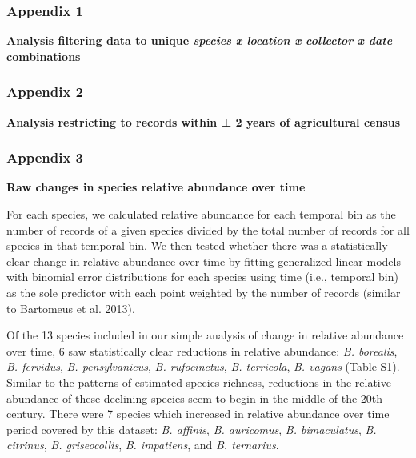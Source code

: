 \documentclass[11pt,]{article}
\begin{document}
\hypertarget{appendix-1}{%
\subsubsection{Appendix 1}\label{appendix-1}}

\textbf{Analysis filtering data to unique \emph{species x location x
collector x date} combinations}

\clearpage

\newpage

\hypertarget{appendix-2}{%
\subsubsection{Appendix 2}\label{appendix-2}}

\textbf{Analysis restricting to records within ± 2 years of agricultural
census}

\newpage

\hypertarget{appendix-3}{%
\subsubsection{Appendix 3}\label{appendix-3}}

\textbf{Raw changes in species relative abundance over time}

For each species, we calculated relative abundance for each temporal bin
as the number of records of a given species divided by the total number
of records for all species in that temporal bin. We then tested whether
there was a statistically clear change in relative abundance over time
by fitting generalized linear models with binomial error distributions
for each species using time (i.e., temporal bin) as the sole predictor
with each point weighted by the number of records (similar to Bartomeus
et al. 2013).

Of the 13 species included in our simple analysis of change in relative
abundance over time, 6 saw statistically clear reductions in relative
abundance: \emph{B. borealis}, \emph{B. fervidus}, \emph{B.
pensylvanicus}, \emph{B. rufocinctus}, \emph{B. terricola}, \emph{B.
vagans} (Table S1). Similar to the patterns of estimated species
richness, reductions in the relative abundance of these declining
species seem to begin in the middle of the 20th century. There were 7
species which increased in relative abundance over time period covered
by this dataset: \emph{B. affinis}, \emph{B. auricomus}, \emph{B.
bimaculatus}, \emph{B. citrinus}, \emph{B. griseocollis}, \emph{B.
impatiens}, and \emph{B. ternarius}.
\end{document}
